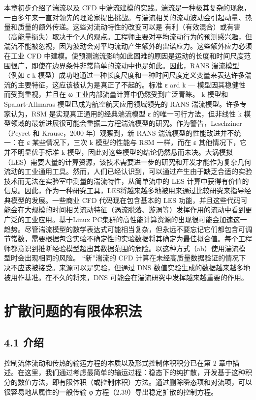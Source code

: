 \documentclass[11pt,a4paper,openany,fontset=none]{ctexbook}
\begin{document}
本章初步介绍了湍流以及 CFD 中湍流建模的实践。湍流是一种极其复杂的现象，一百多年来一直对领先的理论家提出挑战。与湍流相关的流动波动会引起动量、热量和质量的额外传递。这些对流动特性的改变可以是
有利（有效混合）或有害（高能量损失）取决于个人的观点。工程师主要对平均流动行为的预测感兴趣，但湍流不能被忽视，因为波动会对平均流动产生额外的雷诺应力。这些额外应力必须在工业 CFD 中建模。使预测湍流影响如此困难的原因是运动的长度和时间尺度范围很广，即使在边界条件非常简单的流动中也是如此。因此，RANS 湍流模型（例如 ε k 模型）成功地通过一种长度尺度和一种时间尺度定义变量来表达许多湍流的主要特征，这应该被认为是真正了不起的。标准 ε ard k — 模型因其稳健性而受到重视，并且在 ω 工业内部流量计算中仍然受到广泛青睐。 k 模型和 Spalart-Allmaras 模型已成为航空航天应用领域领先的 RANS 湍流模型。许多专家认为，RSM 是实现真正通用的经典湍流模型 ε 的唯一可行方法，但非线性 k 模型领域的最新进展很可能会重振二方程湍流模型的研究。作为警告，Leschziner（Peyret 和 Krause，2000 年）观察到，新 RANS 湍流模型的性能改进并不统一：在 ε 某些情况下，三次 k 模型的性能与 RSM 一样，而在 ε 其他情况下，它并不明显优于标准 k 模型，因此对这些模型的结论仍然悬而未决。大涡模拟（LES）需要大量的计算资源，该技术需要进一步的研究和开发才能作为复杂几何流动的工业通用工具。然而，人们已经认识到，可以通过产生由于缺乏合适的实验技术而无法在实验室中测量的湍流特性，从简单流中的 LES 计算中获得有价值的信息。因此，作为一种研究工具，LES将越来越多地被用来通过比较研究来指导经典模型的发展。一些商业 CFD 代码现在包含基本的 LES 功能，并且这些代码可能会在大规模的时间相关流动特征（涡流脱落、漩涡等）发挥作用的流动中看到更广泛的工业应用。基于Linux PC集群的高性能计算资源的出现很可能会加速这一趋势。尽管湍流模型的数学表达式可能相当复杂，但永远不要忘记它们都包含可调节常数，需要根据包含实验不确定性的实验数据将其确定为最佳拟合值。每个工程师都意识到推断经验模型超出其数据范围的危险。以这种方式（ab）使用湍流模型时会出现相同的风险。 “新”湍流的 CFD 计算在未经高质量数据验证的情况下决不应该被接受。来源可以是实验，但通过 DNS 数值实验生成的数据越来越多地被用作基准。在不久的将来，DNS 可能会在湍流研究中发挥越来越重要的作用。

\chapter{扩散问题的有限体积法}

\section*{4.1 介绍}

控制流体流动和传热的输运方程的本质以及形式控制体积积分已在第 2 章中描述。在这里，我们通过考虑最简单的输运过程：稳态下的纯扩散，开发基于这种积分的数值方法，即有限体积（或控制体积）方法。通过删除瞬态项和对流项，可以很容易地从属性的一般传输 φ 方程（2.39）导出稳定扩散的控制方程。
\end{document}
